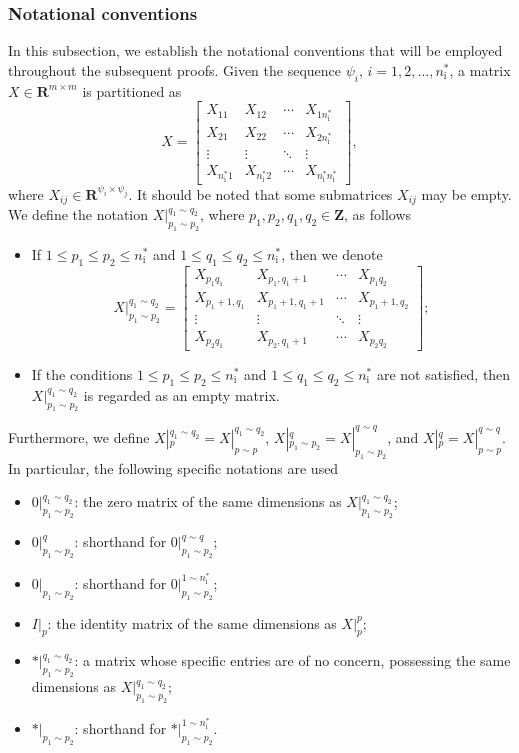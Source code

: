 \documentclass[sort&compress]{elsarticle}
\newcommand\nsharp{n_\mathrm i^*}
\newcommand\R{\mathbf R}
\begin{document}
\subsubsection{Notational conventions}

In this subsection, we establish the notational conventions that
will be employed throughout the subsequent proofs.
Given the sequence $\psi_i$, $i=1,2,\dots,\nsharp$,
a matrix $X \in \R^{m \times m}$ is partitioned as
\[
X=\begin{bmatrix}
X_{11}&X_{12}&\cdots&X_{1\nsharp}\\
X_{21}&X_{22}&\cdots&X_{2\nsharp}\\
\vdots&\vdots&\ddots&\vdots\\
X_{\nsharp1}&X_{\nsharp2}&\cdots&X_{\nsharp\nsharp}
\end{bmatrix},
\]
where $X_{ij} \in \R^{\psi_i \times \psi_j}$.
It should be noted that some submatrices $X_{ij}$ may be empty.
We define the notation $X|_{p_1\sim p_2}^{q_1\sim q_2}$,
where $p_1, p_2, q_1, q_2 \in \mathbf Z$, as follows
\begin{itemize}
\item If $1 \le p_1 \le p_2 \le \nsharp$ and $1 \le q_1 \le q_2 \le \nsharp$,
then we denote
\[
X|_{p_1\sim p_2}^{q_1\sim q_2}
=\begin{bmatrix}
X_{p_1q_1}&X_{p_1,q_1+1}&\cdots&X_{p_1q_2}\\
X_{p_1+1,q_1}&X_{p_1+1,q_1+1}&\cdots&X_{p_1+1,q_2}\\
\vdots&\vdots&\ddots&\vdots\\
X_{p_2q_1}&X_{p_2,q_1+1}&\cdots&X_{p_2q_2}
\end{bmatrix};
\]
\item If the conditions $1 \le p_1 \le p_2 \le \nsharp$ and $1 \le q_1 \le q_2 \le \nsharp$ are not satisfied,
then $X|_{p_1\sim p_2}^{q_1\sim q_2}$ is regarded as an empty matrix.
\end{itemize}
Furthermore, we define $X|_p^{q_1\sim q_2} = X|_{p\sim p}^{q_1\sim q_2}$,
$X|_{p_1\sim p_2}^q = X|_{p_1\sim p_2}^{q\sim q}$,
and $X|_p^q = X|_{p\sim p}^{q\sim q}$.
In particular, the following specific notations are used
\begin{itemize}
\item $0|_{p_1\sim p_2}^{q_1\sim q_2}$:
the zero matrix of the same dimensions as
$X|_{p_1\sim p_2}^{q_1\sim q_2}$;
\item $0|_{p_1\sim p_2}^q$:
shorthand for $0|_{p_1\sim p_2}^{q\sim q}$;
\item $0|_{p_1\sim p_2}$:
shorthand for $0|_{p_1\sim p_2}^{1\sim\nsharp}$;
\item $I|_p$:
the identity matrix of the same dimensions as $X|_p^p$;
\item $*|_{p_1\sim p_2}^{q_1\sim q_2}$:
a matrix whose specific entries are of no concern,
possessing the same dimensions as $X|_{p_1\sim p_2}^{q_1\sim q_2}$;
\item $*|_{p_1\sim p_2}$:
shorthand for $*|_{p_1\sim p_2}^{1\sim\nsharp}$.
\end{itemize}
\end{document}
